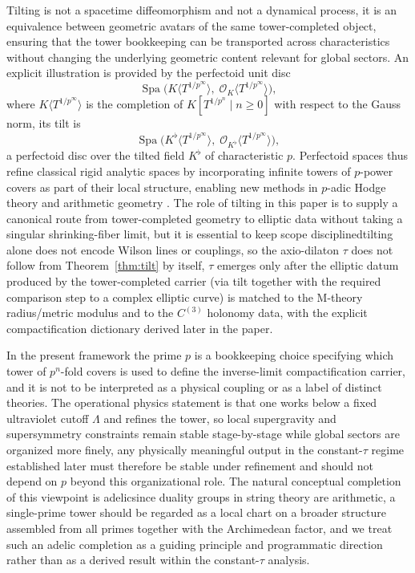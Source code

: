 \documentclass[11pt]{article}
\theoremstyle{remark}
\newcommand{\calO}{\mathcal{O}}
\DeclareMathOperator{\Spa}{Spa}
\begin{document}
 Tilting is not a spacetime diffeomorphism and not a dynamical process, it is an equivalence between geometric avatars of the same tower-completed object, ensuring that the tower bookkeeping can be transported across characteristics without changing the underlying geometric content relevant for global sectors. An explicit illustration is provided by the perfectoid unit disc
\begin{equation}\label{11}
\Spa\!\bigl(K\langle T^{1/p^\infty}\rangle,\;\calO_K\langle T^{1/p^\infty}\rangle\bigr),
\end{equation}
where \(K\langle T^{1/p^\infty}\rangle\) is the completion of \(K[T^{1/p^n}\mid n\ge 0]\) with respect to the Gauss norm, its tilt is
\begin{equation}\label{12}
\Spa\!\bigl(K^\flat\langle T^{1/p^\infty}\rangle,\;\calO_{K^\flat}\langle T^{1/p^\infty}\rangle\bigr),
\end{equation}
a perfectoid disc over the tilted field \(K^\flat\) of characteristic \(p\). Perfectoid spaces thus refine classical rigid analytic spaces by incorporating infinite towers of \(p\)-power covers as part of their local structure, enabling new methods in \(p\)-adic Hodge theory and arithmetic geometry \cite{BhattScholze2019, KedlayaLiu2015}. The role of tilting in this paper is to supply a canonical route from tower-completed geometry to elliptic data without taking a singular shrinking-fiber limit, but it is essential to keep scope disciplined\:tilting alone does not encode Wilson lines or couplings, so the axio-dilaton \(\tau\) does not follow from Theorem~\ref{thm:tilt} by itself, \(\tau\) emerges only after the elliptic datum produced by the tower-completed carrier (via tilt together with the required comparison step to a complex elliptic curve) is matched to the M-theory radius/metric modulus and to the \(C^{(3)}\) holonomy data, with the explicit compactification dictionary derived later in the paper.

In the present framework the prime \(p\) is a bookkeeping choice specifying which tower of \(p^{n}\)-fold covers is used to define the inverse-limit compactification carrier, and it is not to be interpreted as a physical coupling or as a label of distinct theories. The operational physics statement is that one works below a fixed ultraviolet cutoff \(\Lambda\) and refines the tower, so local supergravity and supersymmetry constraints remain stable stage-by-stage while global sectors are organized more finely, any physically meaningful output in the constant-\(\tau\) regime established later must therefore be stable under refinement and should not depend on \(p\) beyond this organizational role. The natural conceptual completion of this viewpoint is adelic\:since duality groups in string theory are arithmetic, a single-prime tower should be regarded as a local chart on a broader structure assembled from all primes together with the Archimedean factor, and we treat such an adelic completion as a guiding principle and programmatic direction rather than as a derived result within the constant-\(\tau\) analysis.
\end{document}
